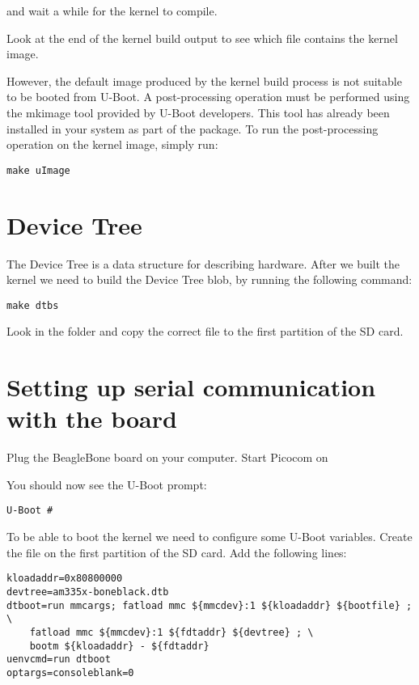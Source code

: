 and wait a while for the kernel to compile.

Look at the end of the kernel build output to see which file contains
the kernel image.

However, the default image produced by the kernel build process is not
suitable to be booted from U-Boot. A post-processing operation must be
performed using the mkimage tool provided by U-Boot developers. This
tool has already been installed in your system as part of the
 package. To run the post-processing operation on
the kernel image, simply run:

\begin{verbatim}
make uImage
\end{verbatim}

\section{Device Tree}
The Device Tree is a data structure for describing hardware.
After we built the kernel we need to build the Device Tree blob,
by running the following command:

\begin{verbatim}
make dtbs
\end{verbatim}

Look in the  folder and copy the correct  file to the first partition of the SD card.

\section{Setting up serial communication with the board}

Plug the BeagleBone board on your computer. Start Picocom on 

You should now see the U-Boot prompt:

\begin{verbatim}
U-Boot #
\end{verbatim}

To be able to boot the kernel we need to configure some U-Boot variables.
Create the file  on the first partition of the SD card.
Add the following lines:

\begin{verbatim}
kloadaddr=0x80800000
devtree=am335x-boneblack.dtb
dtboot=run mmcargs; fatload mmc ${mmcdev}:1 ${kloadaddr} ${bootfile} ; \
    fatload mmc ${mmcdev}:1 ${fdtaddr} ${devtree} ; \
    bootm ${kloadaddr} - ${fdtaddr}
uenvcmd=run dtboot
optargs=consoleblank=0
\end{verbatim}

